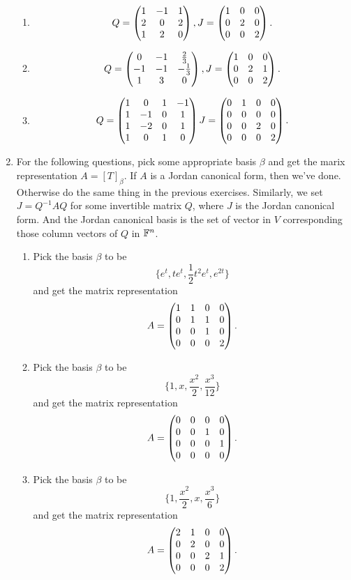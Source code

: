 \begin{enumerate}
\begin{enumerate}
\item 
\[Q=\begin{pmatrix}1 & -1 & 1\cr 2 & 0 & 2\cr 1 & 2 & 0\end{pmatrix},J=\begin{pmatrix}1 & 0 & 0\cr 0 & 2 & 0\cr 0 & 0 & 2\end{pmatrix}.\]
\item 
\[Q=\begin{pmatrix}0 & -1 & \frac{2}{3}\cr -1 & -1 & -\frac{1}{3}\cr 1 & 3 & 0\end{pmatrix},J=\begin{pmatrix}1 & 0 & 0\cr 0 & 2 & 1\cr 0 & 0 & 2\end{pmatrix}.\]
\item 
\[Q=\begin{pmatrix}1 & 0 & 1 & -1\cr 1 & -1 & 0 & 1\cr 1 & -2 & 0 & 1\cr 1 & 0 & 1 & 0\end{pmatrix}J=\begin{pmatrix}0 & 1 & 0 & 0\cr 0 & 0 & 0 & 0\cr 0 & 0 & 2 & 0\cr 0 & 0 & 0 & 2\end{pmatrix}.\]
\end{enumerate}
\item For the following questions, pick some appropriate basis $\beta$ and get the marix representation $A=[T]_{\beta}$. If $A$ is a Jordan canonical form, then we've done. Otherwise do the same thing in the previous exercises. Similarly, we set $J=Q^{-1}AQ$ for some invertible matrix $Q$, where $J$ is the Jordan canonical form. And the Jordan canonical basis is the set of vector in $V$ corresponding those column vectors of $Q$ in $\mathbb{F}^n$.
\begin{enumerate}
\item Pick the basis $\beta $ to be 
\[\{e^t,te^t,\frac{1}{2}t^2e^t,e^{2t}\}\]
and get the matrix representation 
\[A=\begin{pmatrix}1 & 1 & 0 & 0\cr 0 & 1 & 1 & 0\cr 0 & 0 & 1 & 0\cr 0 & 0 & 0 & 2\end{pmatrix}.\]
\item Pick the basis $\beta $ to be 
\[\{1,x,\frac{x^2}{2},\frac{x^3}{12}\}\]
and get the matrix representation 
\[A=\begin{pmatrix}0 & 0 & 0 & 0\cr 0 & 0 & 1 & 0\cr 0 & 0 & 0 & 1\cr 0 & 0 & 0 & 0\end{pmatrix}.\]
\item Pick the basis $\beta $ to be 
\[\{1,\frac{x^2}{2},x,\frac{x^3}{6}\}\]
and get the matrix representation 
\[A=\begin{pmatrix}2 & 1 & 0 & 0\cr 0 & 2 & 0 & 0\cr 0 & 0 & 2 & 1\cr 0 & 0 & 0 & 2\end{pmatrix}.\]

\end{enumerate}
\end{enumerate}
